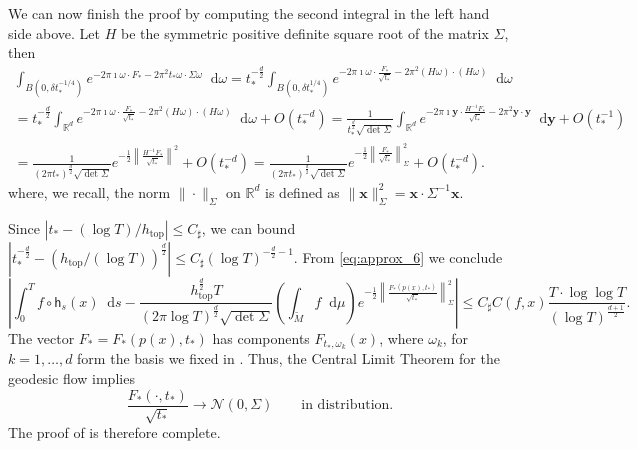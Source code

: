 \documentclass[11pt,letterpaper]{amsart}
\newcommand \R {{ \mathbb R}}
\newcommand \tM {{\widetilde M}}
\newcommand \sC {{C_\sharp}}
\newcommand{\horo}{\mathsf{h}}
\newcommand*{\diff}{\mathop{}\!\mathrm{d}}
\newcommand{\xb}{\mathbf{x}}
\newcommand{\yb}{\mathbf{y}}
\DeclareMathOperator{\topp}{top}
\theoremstyle{definition}
\begin{document}
We can now finish the proof by computing the second integral in the left hand side above. Let $H$ be the symmetric positive definite square root of the matrix $\Sigma$, then
\begin{multline*}
	\int_{B(0,\delta t_{\ast}^{-1/4})} e^{- 2 \pi \imath \omega \cdot F_{\ast} -2\pi^2  t_{\ast} \omega \cdot \Sigma \omega }  \diff \omega
	=  t_{\ast}^{-\frac{d}{2}} \int_{B(0,\delta t_{\ast}^{1/4} )} e^{- 2 \pi \imath \omega \cdot \frac{ F_{\ast}}{\sqrt{ t_{\ast}}} -2\pi^2 (H\omega) \cdot (H\omega) }  \diff \omega \\
	=  t_{\ast}^{-\frac{d}{2}} \int_{\R^d} e^{- 2 \pi \imath \omega \cdot \frac{ F_{\ast}}{\sqrt{ t_{\ast}}} -2\pi^2(H\omega) \cdot (H\omega) }  \diff \omega +O( t_{\ast}^{-d})
	= \frac{1}{ t_{\ast}^{\frac{d}{2}}\sqrt{\det \Sigma}} \int_{\R^d} e^{- 2 \pi \imath \yb \cdot \frac{H^{-1}  F_{\ast}}{\sqrt{ t_{\ast}}} -2\pi^2\yb \cdot \yb }  \diff \yb +O( t_{\ast}^{-1}) \\
	= \frac{1}{(2\pi  t_{\ast})^{\frac{d}{2}}\sqrt{\det \Sigma}} e^{-\frac{1}{2}  \left\| \frac{H^{-1}  F_{\ast}}{\sqrt{ t_{\ast}} } \right\|^2}+O( t_{\ast}^{-d})
	= \frac{1}{(2\pi  t_{\ast})^{\frac{d}{2}}\sqrt{\det \Sigma}}  e^{-\frac{1}{2}  \left\| \frac{ F_{\ast}}{\sqrt{ t_{\ast}} } \right\|_{\Sigma}^2 }+O( t_{\ast}^{-d}).
\end{multline*} 
where, we recall, the norm $\|\cdot\|_{\Sigma}$ on $\R^d$ is defined as $\|\xb\|_{\Sigma}^2 = \xb \cdot \Sigma^{-1} \xb$.

Since $| t_{\ast} - (\log T)/h_{\topp}| \leq\sC$, we can bound $|t_{\ast}^{-\frac{d}{2}} - (h_{\topp}/(\log T))^{\frac{d}{2}}| \leq \sC (\log T)^{-\frac{d}{2}-1}$. 
From \eqref{eq:approx_6} we conclude
\begin{equation*}
	\left\lvert \int_{0}^{T} f \circ \horo_s(x) \diff s -   \frac{h_{\topp}^{\frac{d}{2}} T }{ (2\pi \log T)^{\frac{d}{2}}\sqrt{\det \Sigma}} \left(\int_{\tM} f \diff \mu \right) e^{-\frac{1}{2}  \left\| \frac{ F_{\ast}(p(x),t_{\ast} )}{\sqrt{t_{\ast} } } \right\|_{\Sigma}^2 } \right\rvert  \leq \sC C(f,x) \frac{T \cdot \log \log T}{(\log T)^{\frac{d+1}{2}}}. 
\end{equation*}
The vector $F_{\ast} = F_{\ast}(p(x), t_{\ast} )$ has components $F_{t_{\ast} ,\omega_k}(x)$, where $\omega_k$, for $k=1,\dots,d$ form the basis we fixed in . Thus, the Central Limit Theorem for the geodesic flow implies
\[
\frac{F_{\ast}(\cdot, t_{\ast} )}{\sqrt{t_{\ast} }} \to \mathcal{N}(0, \Sigma) \qquad \text{in distribution.}
\]
The proof of  is therefore complete.
\end{document}
